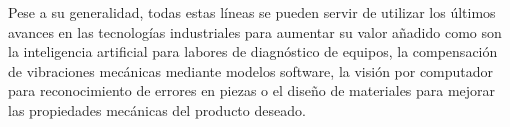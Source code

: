 Pese a su generalidad, todas estas líneas se pueden servir de utilizar los últimos avances en las tecnologías industriales para aumentar su valor añadido como son la inteligencia artificial para labores de diagnóstico de equipos, la compensación de vibraciones mecánicas mediante modelos software, la visión por computador para reconocimiento de errores en piezas o el diseño de materiales para mejorar las propiedades mecánicas del producto deseado.